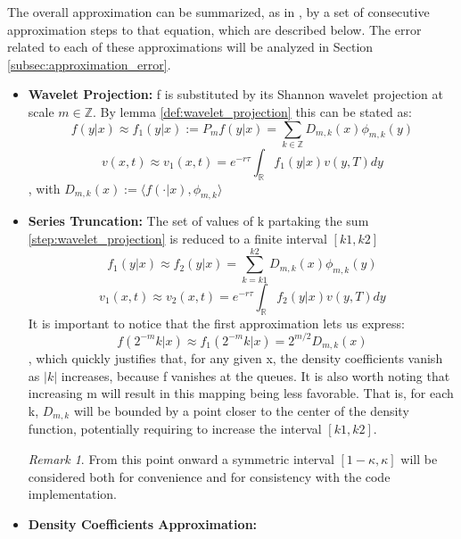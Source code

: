 \documentclass[12,twoside]{mammeTFM}
\theoremstyle{definition}
\theoremstyle{remark}
\newtheorem{remark}[thm]{Remark}
\newcommand{\Z}{\ensuremath{\mathbb{Z}}}
\newcommand{\R}{\ensuremath{\mathbb{R}}}
\begin{document}
The overall approximation can be summarized, as in \cite{mar17}, by a set of consecutive approximation steps to that equation, which are described below. The error related to each of these approximations will be analyzed in Section \ref{subsec:approximation_error}.

\begin{itemize} \label{swift_steps}

\item \textbf{Wavelet Projection:} f is substituted by its Shannon wavelet projection at scale $m \in \Z$. By lemma \ref{def:wavelet_projection} this can be stated as:
\begin{equation} \label{step:wavelet_projection}
f(y|x) \approx f_1(y|x) := P_mf(y|x) = \sum_{k \in \Z} D_{m,k}(x) \phi_{m,k}(y)
\end{equation}
\begin{equation}
v(x,t) \approx v_1(x,t) = e^{-r \tau} \int_{\R} f_1(y|x)v(y, T)dy
\end{equation}
, with $D_{m,k}(x):=\langle f(\cdot | x), \phi_{m,k} \rangle$
\item \textbf{Series Truncation: } The set of values of k partaking the sum \ref{step:wavelet_projection} is reduced to a finite interval $[k1, k2]$
\begin{equation}
f_1(y|x) \approx f_2(y|x) = \sum_{k = k1}^{k2} D_{m,k}(x)\phi_{m,k}(y)
\end{equation}
\begin{equation} \label{step:series_truncation}
v_1(x,t) \approx v_2(x,t) = e^{-r \tau} \int_{\R} f_2(y|x)v(y, T)dy
\end{equation}
It is important to notice that the first approximation lets us express: 
\begin{equation}
f(2^{-m}k|x) \approx f_1(2^{-m}k|x) = 2^{m/2} D_{m,k}(x)
\end{equation}
, which quickly justifies that, for any given x, the density coefficients vanish as $|k|$ increases, because f vanishes at the queues. It is also worth noting that increasing m will result in this mapping being less favorable. That is, for each k, $D_{m,k}$ will be bounded by a point closer to the center of the density function, potentially requiring to increase the interval $[k1, k2]$.
\begin{remark}
From this point onward a symmetric interval $[1 - \kappa, \kappa]$ will be considered both for convenience and for consistency with the code implementation.
\end{remark}
\item \textbf{Density Coefficients Approximation: }

\end{itemize}
\end{document}
